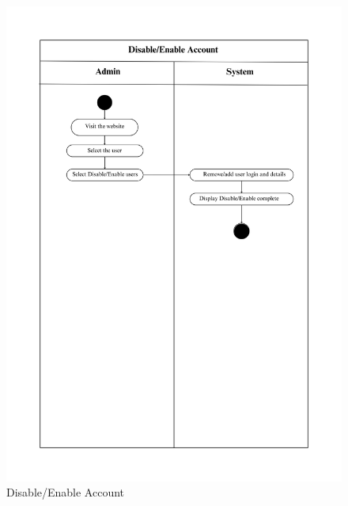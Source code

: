 \begin{figure}[h]
    \centering
    \includegraphics[width=1\textwidth]{Images/Activity Diagrams/4 Disable_Enable Account.png}
    \caption{Disable/Enable Account}
    \label{fig:activity-account}
\end{figure}


